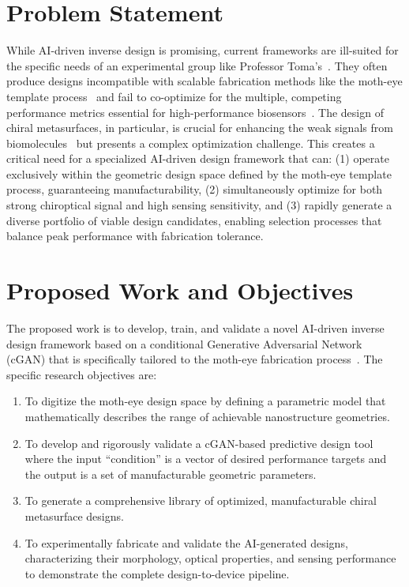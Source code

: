 \documentclass[12pt,a4paper]{article}
\begin{document}
\section{Problem Statement}
While AI-driven inverse design is promising, current frameworks are ill-suited for the specific needs of an experimental group like Professor Toma's~\cite{dl_nanophotonics_researching,nanophotonic_biosensors_review}. They often produce designs incompatible with scalable fabrication methods like the moth-eye template process~\cite{nil_metasurface_review} and fail to co-optimize for the multiple, competing performance metrics essential for high-performance biosensors~\cite{ml_metaplasmonic_biosensors}. The design of chiral metasurfaces, in particular, is crucial for enhancing the weak signals from biomolecules~\cite{nn_chiral_nanodimer} but presents a complex optimization challenge. This creates a critical need for a specialized AI-driven design framework that can: (1) operate exclusively within the geometric design space defined by the moth-eye template process, guaranteeing manufacturability, (2) simultaneously optimize for both strong chiroptical signal and high sensing sensitivity, and (3) rapidly generate a diverse portfolio of viable design candidates, enabling selection processes that balance peak performance with fabrication tolerance.

\section{Proposed Work and Objectives}
The proposed work is to develop, train, and validate a novel AI-driven inverse design framework based on a conditional Generative Adversarial Network (cGAN) that is specifically tailored to the moth-eye fabrication process~\cite{dl_nanophotonics_rg}. The specific research objectives are:

\begin{enumerate}
  \item To digitize the moth-eye design space by defining a parametric model that mathematically describes the range of achievable nanostructure geometries.
  \item To develop and rigorously validate a cGAN-based predictive design tool where the input ``condition'' is a vector of desired performance targets and the output is a set of manufacturable geometric parameters.
  \item To generate a comprehensive library of optimized, manufacturable chiral metasurface designs.
  \item To experimentally fabricate and validate the AI-generated designs, characterizing their morphology, optical properties, and sensing performance to demonstrate the complete design-to-device pipeline.
\end{enumerate}
\end{document}
